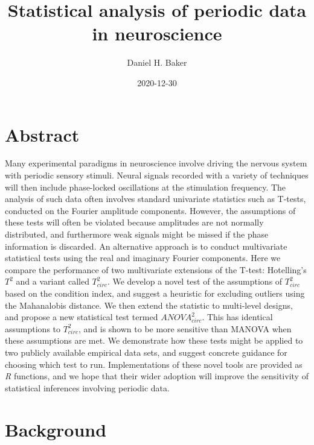 \documentclass[]{article}
\title{Statistical analysis of periodic data in neuroscience}
\author{Daniel H. Baker}
\date{2020-12-30}
\begin{document}
\maketitle

\hypertarget{abstract}{%
\section{Abstract}\label{abstract}}

Many experimental paradigms in neuroscience involve driving the nervous system with periodic sensory stimuli. Neural signals recorded with a variety of techniques will then include phase-locked oscillations at the stimulation frequency. The analysis of such data often involves standard univariate statistics such as T-tests, conducted on the Fourier amplitude components. However, the assumptions of these tests will often be violated because amplitudes are not normally distributed, and furthermore weak signals might be missed if the phase information is discarded. An alternative approach is to conduct multivariate statistical tests using the real and imaginary Fourier components. Here we compare the performance of two multivariate extensions of the T-test: Hotelling's \(T^2\) and a variant called \(T^2_{circ}\). We develop a novel test of the assumptions of \(T^2_{circ}\) based on the condition index, and suggest a heuristic for excluding outliers using the Mahanalobis distance. We then extend the statistic to multi-level designs, and propose a new statistical test termed \(ANOVA^2_{circ}\). This has identical assumptions to \(T^2_{circ}\), and is shown to be more sensitive than MANOVA when these assumptions are met. We demonstrate how these tests might be applied to two publicly available empirical data sets, and suggest concrete guidance for choosing which test to run. Implementations of these novel tools are provided as \emph{R} functions, and we hope that their wider adoption will improve the sensitivity of statistical inferences involving periodic data.

\hypertarget{background}{%
\section{Background}\label{background}}
\end{document}
